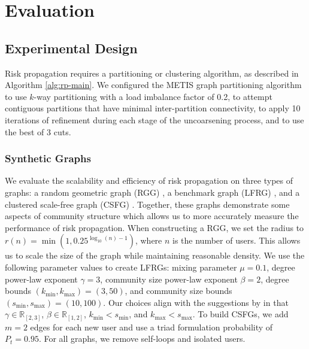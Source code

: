 \chapter{Evaluation}\label{sec:evaluation} %

\section{Experimental Design}

Risk propagation requires a partitioning or clustering algorithm, as described in Algorithm \ref{alg:rp-main}. We configured the METIS graph partitioning algorithm \cite{Karypis1998} to use $k$-way partitioning with a load imbalance factor of 0.2, to attempt contiguous partitions that have minimal inter-partition connectivity, to apply 10 iterations of refinement during each stage of the uncoarsening process, and to use the best of 3 cuts.

\subsection{Synthetic Graphs}\label{sec:synthetic-eval}

We evaluate the scalability and efficiency of risk propagation on three types of graphs: a random geometric graph (RGG) \cite{Dall2002}, a benchmark graph (LFRG) \cite{Lancichinetti2008}, and a clustered scale-free graph (CSFG) \cite{Holme2002}. Together, these graphs demonstrate some aspects of community structure \cite{Fortunato2010} which allows us to more accurately measure the performance of risk propagation. When constructing a RGG, we set the radius to $r(n) = \min \left(1, 0.25^{\log_{10}(n) - 1}\right)$, where $n$ is the number of users. This allows us to scale the size of the graph while maintaining reasonable density. We use the following parameter values to create LFRGs: mixing parameter $\mu = 0.1$, degree power-law exponent $\gamma = 3$, community size power-law exponent $\beta = 2$, degree bounds $(k_{\min}, k_{\max}) = (3, 50)$, and community size bounds $(s_{\min}, s_{\max}) = (10, 100)$. Our choices align with the suggestions by \cite{Lancichinetti2008} in that $\gamma \in \mathbb{R}_{[2, 3]}$,  $\beta \in \mathbb{R}_{[1, 2]}$, $k_{\min} < s_{\min}$, and $k_{\max} < s_{\max}$. To build CSFGs, we add $m = 2$ edges for each new user and use a triad formulation probability of $P_t = 0.95$. For all graphs, we remove self-loops and isolated users.

